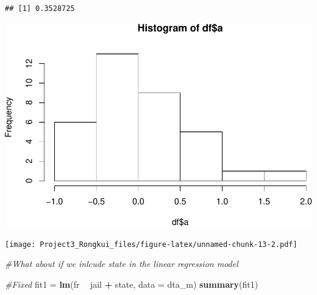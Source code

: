\documentclass[]{article}
\newenvironment{Shaded}{\begin{snugshade}}{\end{snugshade}}
\newcommand{\CommentTok}[1]{\textcolor[rgb]{0.56,0.35,0.01}{\textit{#1}}}
\newcommand{\DataTypeTok}[1]{\textcolor[rgb]{0.13,0.29,0.53}{#1}}
\newcommand{\KeywordTok}[1]{\textcolor[rgb]{0.13,0.29,0.53}{\textbf{#1}}}
\newcommand{\NormalTok}[1]{#1}
\newcommand{\OperatorTok}[1]{\textcolor[rgb]{0.81,0.36,0.00}{\textbf{#1}}}
\newcommand{\StringTok}[1]{\textcolor[rgb]{0.31,0.60,0.02}{#1}}
\begin{document}
\begin{verbatim}
## [1] 0.3528725
\end{verbatim}

\begin{Shaded}
\end{Shaded}

\includegraphics{Project3_Rongkui_files/figure-latex/unnamed-chunk-13-1.pdf}

\begin{Shaded}
\end{Shaded}

\texttt{[image: Project3\_Rongkui\_files/figure-latex/unnamed-chunk-13-2.pdf]}

\begin{Shaded}
\begin{Highlighting}[]
\CommentTok{#What about if we inlcude state in the linear regression model}

\CommentTok{#Fixed}
\NormalTok{fit1 =}\StringTok{ }\KeywordTok{lm}\NormalTok{(fr }\OperatorTok{~}\StringTok{ }\NormalTok{jail }\OperatorTok{+}\StringTok{ }\NormalTok{state, }\DataTypeTok{data =}\NormalTok{ dta_m)}
\KeywordTok{summary}\NormalTok{(fit1)}
\end{Highlighting}
\end{Shaded}
\end{document}
